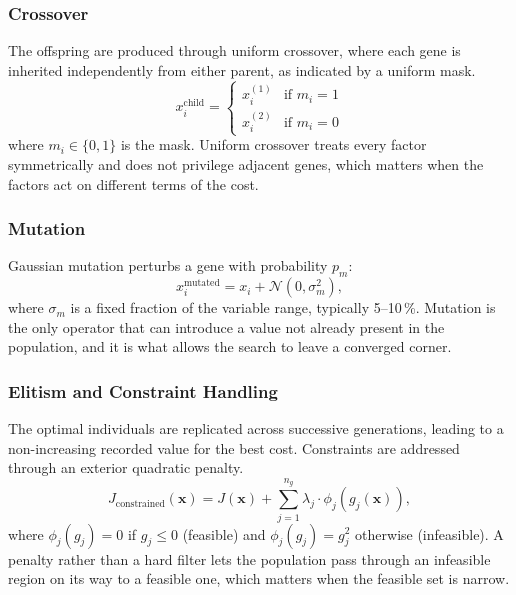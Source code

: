\subsubsection{Crossover}
The offspring are produced through uniform crossover, where each gene is inherited independently from either parent, as indicated by a uniform mask.
\begin{equation}
    x_i^{\text{child}} = \begin{cases} x_i^{(1)} & \text{if } m_i = 1 \\ x_i^{(2)} & \text{if } m_i = 0 \end{cases}
    \label{eq:crossover}
\end{equation}
\noindent where $m_i \in \{0, 1\}$ is the mask. Uniform crossover treats every factor symmetrically and does not privilege adjacent genes, which matters when the factors act on different terms of the cost.

\subsubsection{Mutation}
Gaussian mutation perturbs a gene with probability $p_m$:
\begin{equation}
    x_i^{\text{mutated}} = x_i + \mathcal{N}(0, \sigma_m^2),
    \label{eq:mutation}
\end{equation}
\noindent where $\sigma_m$ is a fixed fraction of the variable range, typically 5--10\,\%. Mutation is the only operator that can introduce a value not already present in the population, and it is what allows the search to leave a converged corner.

\subsubsection{Elitism and Constraint Handling}
The optimal individuals are replicated across successive generations, leading to a non-increasing recorded value for the best cost. Constraints are addressed through an exterior quadratic penalty.
\begin{equation}
    J_{\text{constrained}}(\mathbf{x}) = J(\mathbf{x}) + \sum_{j=1}^{n_g} \lambda_j \cdot \phi_j\!\left(g_j(\mathbf{x})\right),
    \label{eq:penalty_lit}
\end{equation}
\noindent where $\phi_j(g_j) = 0$ if $g_j \leq 0$ (feasible) and $\phi_j(g_j) = g_j^2$ otherwise (infeasible). A penalty rather than a hard filter lets the population pass through an infeasible region on its way to a feasible one, which matters when the feasible set is narrow.

